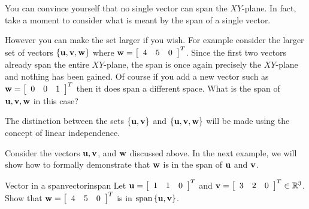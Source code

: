 You can convince yourself that no single vector can span the
$XY$-plane. In fact, take a moment to consider what is meant by the span of a single vector.

However you can make the set larger if you wish. For example consider
the larger set of vectors $\{ {\bf u}, {\bf v},
{\bf w}\}$ where $ {\bf w}=\left[ 
\begin{array}{rrr}
4 & 5 & 0
\end{array}
\right]^T$. 
Since
the first two vectors already span the entire $XY$-plane, the span is
once again precisely the $XY$-plane and nothing has been gained. Of
course if you add a new vector such as
$ {\bf w}=\left[ 
\begin{array}{rrr}
0 & 0 & 1
\end{array}
\right]^T$ then it does span a different space. What is the span of ${\bf u}, {\bf v}, {\bf w}$ in this case?   

The distinction between the sets $\{ {\bf u}, {\bf v}\}$ and $\{
{\bf u}, {\bf v}, {\bf w}\}$ will be made using the concept of linear independence. 

Consider the vectors ${\bf u}, {\bf v}$, and ${\bf w}$ discussed above. In the next example, we will show how to formally demonstrate that ${\bf w}$ is in the span of ${\bf u}$ and ${\bf v}$. 

\begin{example}{Vector in a span}{vectorinspan}
Let ${\bf u}=\left[ 
\begin{array}{rrr}
1  & 1 & 0
\end{array}
\right]^T$ and
${\bf v}=\left[ 
\begin{array}{rrr}
3  & 2 & 0
\end{array}
\right]^T \in \mathbb{R}^{3}$. Show that ${\bf w} = \left[ 
\begin{array}{rrr}
4 & 5 & 0 
\end{array}
\right]^{T}$ is in $\mbox{span} \left\{ {\bf u}, {\bf v} \right\}$.
\end{example}

